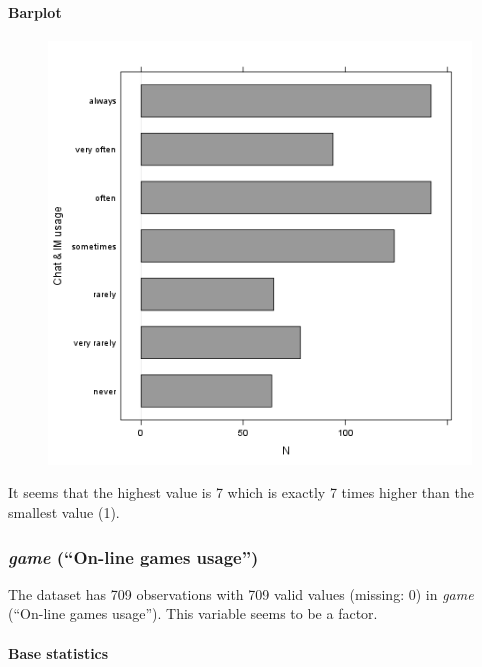 \documentclass{article}
\makeatletter
\def\maxwidth{\ifdim\Gin@nat@width>\linewidth\linewidth
\else\Gin@nat@width\fi}
\let\Oldincludegraphics\includegraphics
\renewcommand{\includegraphics}[1]{\Oldincludegraphics[width=\maxwidth]{#1}}
\makeatother
\begin{document}
\paragraph{Barplot}

\begin{figure}[htbp]
\centering
\includegraphics{18ee2d4410677e2bbc343a9a4889cc97.png}
\caption{}
\end{figure}

It seems that the highest value is 7 which is exactly 7 times higher
than the smallest value (1).

\subsubsection{\emph{game} (``On-line games usage'')}

The dataset has 709 observations with 709 valid values (missing: 0) in
\emph{game} (``On-line games usage''). This variable seems to be a
factor.

\paragraph{Base statistics}
\end{document}
